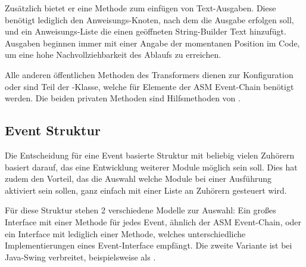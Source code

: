 Zusätzlich bietet er eine Methode zum einfügen von Text-Ausgaben. Diese benötigt lediglich den Anweisungs-Knoten, nach dem die Ausgabe erfolgen soll, und ein Anweisungs-Liste die einen geöffneten String-Builder Text hinzufügt. Ausgaben beginnen immer mit einer Angabe der momentanen Position im Code, um eine hohe Nachvollziehbarkeit des Ablaufs zu erreichen.

Alle anderen öffentlichen Methoden des Transformers dienen zur Konfiguration oder sind Teil der -Klasse, welche für Elemente der ASM Event-Chain benötigt werden. Die beiden privaten Methoden sind Hilfsmethoden von .

\subsection{Event Struktur} 

Die Entscheidung für eine Event basierte Struktur mit beliebig vielen Zuhörern basiert darauf, das eine Entwicklung weiterer Module möglich sein soll. Dies hat zudem den Vorteil, das die Auswahl welche Module bei einer Ausführung aktiviert sein sollen, ganz einfach mit einer Liste an Zuhörern gesteuert wird.

Für diese Struktur stehen 2 verschiedene Modelle zur Auswahl: Ein großes Interface mit einer Methode für jedes Event, ähnlich der ASM Event-Chain, oder ein Interface mit lediglich einer Methode, welches unterschiedliche Implementierungen eines Event-Interface empfängt. Die zweite Variante ist bei Java-Swing verbreitet, beispielsweise als .

